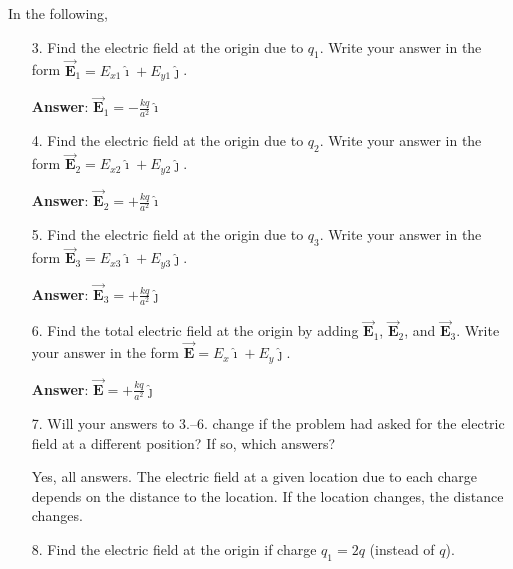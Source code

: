 \documentclass{article}
\newcommand{\ds}[0]{\displaystyle}
\newcommand{\ihat}[0]{\hat{\boldsymbol{\imath}}}
\newcommand{\jhat}[0]{\hat{\boldsymbol{\jmath}}}
\newcommand{\bfvec}[1]{\vec{\mathbf{#1}}}
\begin{document}
In the following, 

\begin{enumerate}

  \item[3.] Find the electric field at the origin due to $q_1$. Write your answer in the form $\bfvec{E}_1=E_{x1}\ihat + E_{y1}\jhat$.

            \ifsolutions
            {\bf Answer}: $\ds\bfvec{E}_1=-\frac{kq}{a^2}\ihat$
            \else

            \vskip 72pt
            \fi

  \item[4.] Find the electric field at the origin due to $q_2$. Write your answer in the form $\bfvec{E}_2=E_{x2}\ihat + E_{y2}\jhat$.

            \ifsolutions
            {\bf Answer}: $\ds\bfvec{E}_2=+\frac{kq}{a^2}\ihat$
            \else

            \vskip 72pt
            \fi

  \item[5.] Find the electric field at the origin due to $q_3$. Write your answer in the form $\bfvec{E}_3=E_{x3}\ihat + E_{y3}\jhat$.

            \ifsolutions
            {\bf Answer}: $\ds\bfvec{E}_3=+\frac{kq}{a^2}\jhat$
            \else

            \vskip 72pt
            \fi

  \item[6.] Find the total electric field at the origin by adding $\bfvec{E}_1$, $\bfvec{E}_2$, and $\bfvec{E}_3$. Write your answer in the form $\bfvec{E}=E_{x}\ihat + E_{y}\jhat$.

            \ifsolutions
            {\bf Answer}: $\ds\bfvec{E}=+\frac{kq}{a^2}\jhat$
            \else

            \vskip 72pt
            \fi

  \item[7.] Will your answers to 3.--6. change if the problem had asked for the electric field at a different position? If so, which answers?

            \ifsolutions
            Yes, all answers. The electric field at a given location due to each charge depends on the distance to the location. If the location changes, the distance changes.
            \else

            \vskip 72pt
            \fi

  \item[8.] Find the electric field at the origin if charge $q_1=2q$ (instead of $q$).


\end{enumerate}
\end{document}
